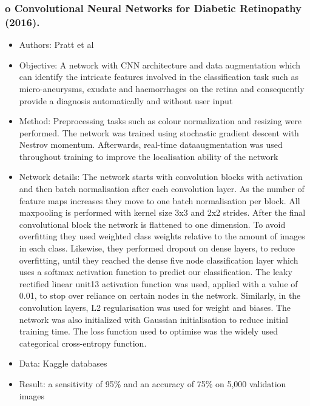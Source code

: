 \documentclass[12pt]{report}
\begin{document}
\subsubsection{o Convolutional Neural Networks for Diabetic Retinopathy (2016). \cite{pratt2016convolutional}}
\begin{itemize}
\item Authors: Pratt et al
\item Objective: A network with CNN architecture and data augmentation which can identify the intricate features involved in the classification task such as micro-aneurysms, exudate and haemorrhages on the retina and consequently provide a diagnosis automatically and without user input
\item Method: Preprocessing tasks such as colour normalization and resizing were performed. The network was trained using stochastic gradient descent with Nestrov momentum. Afterwards, real-time dataaugmentation was used throughout training to improve the localisation ability of the network
\item Network details:  The network starts with convolution blocks with activation and then batch normalisation after each convolution layer. As the number of feature maps increases they move to one batch normalisation per block. All maxpooling is performed with kernel size 3x3 and 2x2 strides. After the final convolutional block the network is flattened to one dimension. To avoid overfitting they used weighted class weights relative to the amount of images in each class. Likewise, they performed dropout on dense layers, to reduce overfitting, until they reached the dense five node classification layer which uses a softmax activation function to predict our classification. The leaky rectified linear unit13 activation function was used, applied with a value of 0.01, to stop over reliance on certain nodes in the network. Similarly, in the convolution layers, L2 regularisation was used for weight and biases. The network was also initialized with Gaussian initialisation to reduce initial training time. The loss function used to optimise was the widely used categorical cross-entropy function.
\item Data: Kaggle databases
\item Result: a sensitivity of 95\% and an accuracy of 75\% on 5,000 validation images
\end{itemize}
\end{document}
